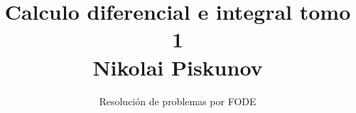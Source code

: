 \normalfont

\author{\Large Resolución de problemas por FODE}
\title{Calculo diferencial e integral tomo 1\\ \small Nikolai Piskunov}
\date{}
\pagestyle{empty}
\maketitle
\thispagestyle{empty}
\let\cleardoublepage\clearpage
\tableofcontents								%


 
\let\cleardoublepage\clearpage
